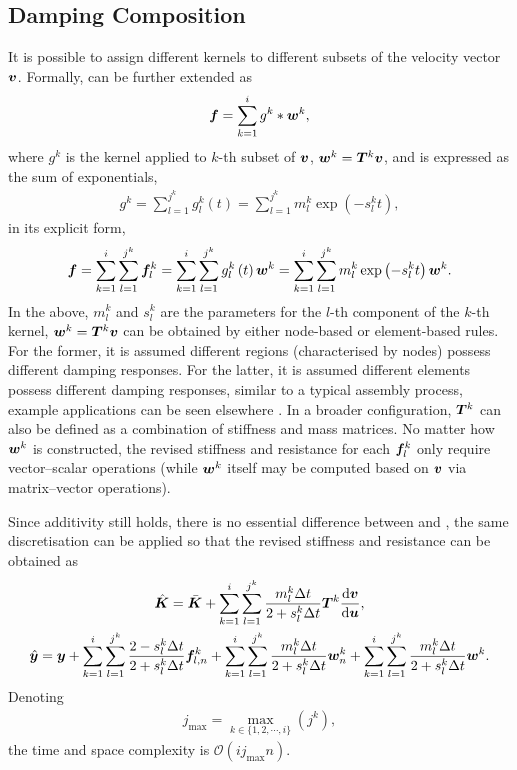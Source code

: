 \subsection{Damping Composition}
It is possible to assign different kernels to different subsets of the velocity vector $\bm{v}$. Formally,  can be further extended as
\begin{gather}
\bm{f}=\sum_{k=1}^{i}g^k*\bm{w}^k,
\end{gather}
where $g^k$ is the kernel applied to $k$-th subset of $\bm{v}$, $\bm{w}^k=\bm{T}^k\bm{v}$, and is expressed as the sum of exponentials,
\begin{gather}
g^k=\sum_{l=1}^{j^k}g_l^k\left(t\right)=\sum_{l=1}^{j^k}m_l^k\exp\left(-s_l^kt\right),
\end{gather}
in its explicit form,
\begin{gather}\label{eq:composition}
\bm{f}=\sum_{k=1}^{i}\sum_{l=1}^{j^k}\bm{f}_l^k=\sum_{k=1}^{i}\sum_{l=1}^{j^k}g_l^k\left(t\right)\bm{w}^k=\sum_{k=1}^{i}\sum_{l=1}^{j^k}m_l^k\exp\left(-s_l^kt\right)\bm{w}^k.
\end{gather}
In the above, $m_l^k$ and $s_l^k$ are the parameters for the $l$-th component of the $k$-th kernel, $\bm{w}^k=\bm{T}^k\bm{v}$ can be obtained by either node-based or element-based rules. For the former, it is assumed different regions (characterised by nodes) possess different damping responses. For the latter, it is assumed different elements possess different damping responses, similar to a typical assembly process, example applications can be seen elsewhere \citep{Friswell2007}.
In a broader configuration, $\bm{T}^k$ can also be defined as a combination of stiffness and mass matrices.
No matter how $\bm{w}^k$ is constructed, the revised stiffness and resistance for each $\bm{f}_l^k$ only require vector--scalar operations (while $\bm{w}^k$ itself may be computed based on $\bm{v}$ via matrix--vector operations).

Since additivity still holds, there is no essential difference between  and , the same discretisation can be applied so that the revised stiffness and resistance can be obtained as
\begin{gather}\label{eq:revised_k_comp}
\hat{\bm{K}}=\bar{\bm{K}}+\sum_{k=1}^{i}\sum_{l=1}^{j^k}\dfrac{m_l^k\Delta{}t}{2+s_l^k\Delta{}t}\bm{T}^k\dfrac{\mathrm{d}\bm{v}}{\mathrm{d}\bm{u}},\\
\label{eq:revised_y_comp}
\hat{\bm{y}}=\bm{y}+\sum_{k=1}^{i}\sum_{l=1}^{j^k}\dfrac{2-s_l^k\Delta{}t}{2+s_l^k\Delta{}t}\bm{f}_{l,n}^k+\sum_{k=1}^{i}\sum_{l=1}^{j^k}\dfrac{m_l^k\Delta{}t}{2+s_l^k\Delta{}t}\bm{w}_n^k+\sum_{k=1}^{i}\sum_{l=1}^{j^k}\dfrac{m_l^k\Delta{}t}{2+s_l^k\Delta{}t}\bm{w}^k.
\end{gather}
Denoting
\begin{gather}
j_\text{max}=\max_{k\in\{1,2,\cdots,i\}}\left(j^k\right),
\end{gather}
the time and space complexity is $\mathcal{O}\left(ij_\text{max}n\right)$.
